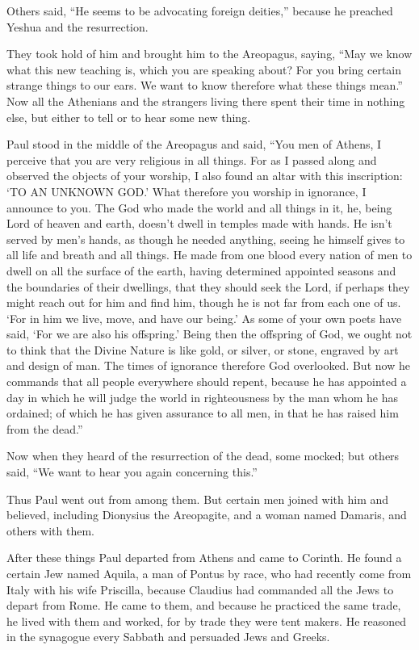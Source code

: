 Others said, “He seems to be advocating foreign deities,” because he preached Yeshua and
the resurrection.

\myverse{}They took hold of him and brought him to the Areopagus, saying,
“May we know what this new teaching is, which you are speaking about?
\myverse{}For you bring certain strange things to our ears. We want to know therefore
what these things mean.”
\myverse{}Now all the Athenians and the strangers living there spent their time in
nothing else, but either to tell or to hear some new thing.

\myverse{}Paul stood in the middle of the Areopagus and said, “You men
of Athens, I perceive that you are very religious in all things.
\myverse{}For as I passed along and observed the objects of your worship, I also found
an altar with this inscription: ‘TO AN UNKNOWN GOD.’ What therefore you worship in ignorance, I announce
to you.
\myverse{}The God who made the world and all things in it, he, being Lord of heaven
and earth, doesn’t dwell in temples made with hands.
\myverse{}He isn’t served by men’s hands, as though he needed anything, seeing he himself
gives to all life and breath and all things.
\myverse{}He made from one blood every nation of men to dwell on all the surface of
the earth, having determined appointed seasons and the boundaries of their dwellings,
\myverse{}that they should seek the Lord, if perhaps they might reach out for him and
find him, though he is not far from each one of us.
\myverse{}‘For in him we live, move, and have our being.’ As some of your own poets
have said, ‘For we are also his offspring.’
\myverse{}Being then the offspring of God, we ought not to think that the Divine Nature
is like gold, or silver, or stone, engraved by art and design of man.
\myverse{}The times of ignorance therefore God overlooked. But now he commands that
all people everywhere should repent,
\myverse{}because he has appointed a day in which he will judge the world in righteousness
by the man whom he has ordained; of which he has given assurance to all men, in that he has raised him
from the dead.”

\myverse{}Now when they heard of the resurrection of the dead, some mocked;
but others said, “We want to hear you again concerning this.”

\myverse{}Thus Paul went out from among them.
\myverse{}But certain men joined with him and believed, including Dionysius the Areopagite,
and a woman named Damaris, and others with them.


\mychapter{=} \myverse*{}After these things Paul departed from Athens and came to Corinth.
\myverse{}He found a certain Jew named Aquila, a man of Pontus by race, who had recently
come from Italy with his wife Priscilla, because Claudius had commanded all the Jews to depart from Rome.
He came to them,
\myverse{}and because he practiced the same trade, he lived with them and worked, for
by trade they were tent makers.
\myverse{}He reasoned in the synagogue every Sabbath and persuaded Jews and Greeks.

